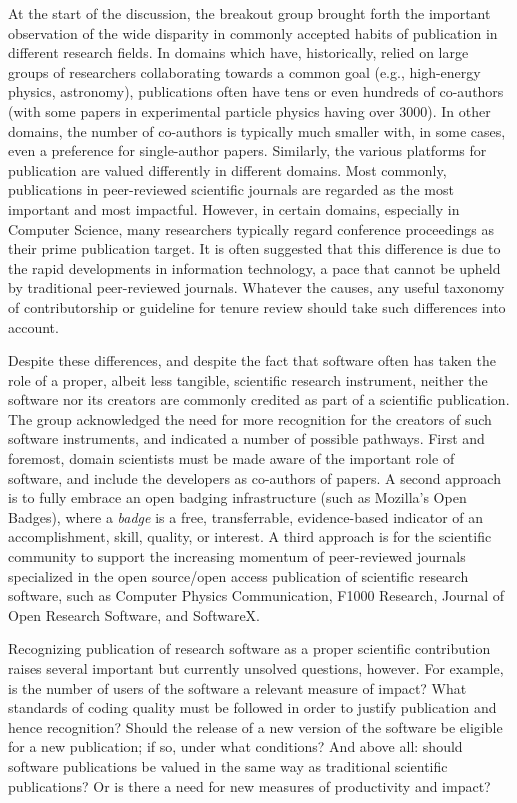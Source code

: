 \documentclass[11pt, oneside]{amsart}
\begin{document}
At the start of the discussion, the breakout group brought forth the important
observation of the wide disparity in commonly accepted habits of publication in
different research fields. In domains which have, historically, relied on large
groups of researchers collaborating towards a common goal (e.g., high-energy
physics, astronomy), publications often have tens or even hundreds of co-authors
(with some papers in experimental particle physics having over 3000). In other
domains, the number of co-authors is typically much smaller with, in some
cases, even a preference for single-author papers. Similarly, the various
platforms for publication are valued differently in different domains. Most
commonly, publications in peer-reviewed scientific journals are regarded as the
most important and most impactful. However, in certain domains, especially in
Computer Science, many researchers typically regard conference proceedings as
their prime publication target. It is often suggested that this difference is
due to the rapid developments in information technology, a pace that cannot be
upheld by traditional peer-reviewed journals. Whatever the causes, any useful
taxonomy of contributorship or guideline for tenure review should take such
differences into account.

Despite these differences, and despite the fact that software often has taken
the role of a proper, albeit less tangible, scientific research instrument,
neither the software nor its creators are commonly credited as part of a
scientific publication. The group acknowledged the need for more recognition for
the creators of such software instruments, and indicated a number of possible
pathways. First and foremost, domain scientists must be made aware of the
important role of software, and include the developers as co-authors of papers.
A second approach is to fully embrace an open badging infrastructure (such as
Mozilla's Open Badges), where a {\em badge} is a free, transferrable,
evidence-based indicator of an accomplishment, skill, quality, or interest. A
third approach is for the scientific community to support the increasing
momentum of peer-reviewed journals specialized in the open source/open access
publication of scientific research software, such as Computer Physics
Communication, F1000 Research, Journal of Open Research Software, and SoftwareX.

Recognizing publication of research software as a proper scientific contribution
raises several important but currently unsolved questions, however. For example,
is the number of users of the software a relevant measure of impact? What
standards of coding quality must be followed in order to justify publication and
hence recognition? Should the release of a new version of the software be
eligible for a new publication; if so, under what conditions? And above all:
should software publications be valued in the same way as traditional scientific
publications? Or is there a need for new measures of productivity and impact?
\end{document}
